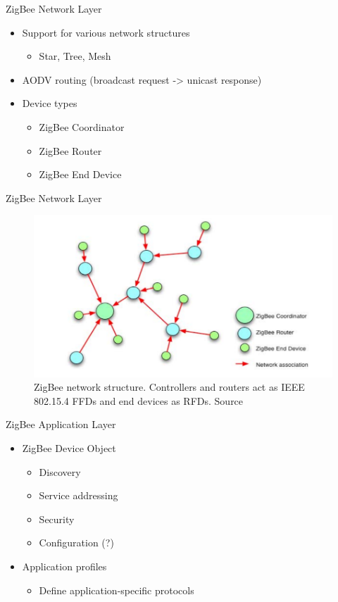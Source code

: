 \documentclass{beamer}
\begin{document}
\begin{frame}{ZigBee Network Layer}
  \begin{itemize}
  	\item Support for various network structures
  	\begin{itemize}
  		\item Star, Tree, Mesh
  	\end{itemize}
  	\item AODV routing (broadcast request -> unicast response)
  	\item Device types
  	\begin{itemize}
  		\item ZigBee Coordinator
  		\item ZigBee Router
  		\item ZigBee End Device
  	\end{itemize}
  \end{itemize}
\end{frame}

\begin{frame}{ZigBee Network Layer}
  \begin{figure}
  \includegraphics[width=\textwidth]{zbnetstructure.png}
  \caption{ZigBee network structure. Controllers and routers act as IEEE 802.15.4 FFDs and end devices as RFDs. Source \cite{zbslides}}
  \end{figure}
\end{frame}

\begin{frame}{ZigBee Application Layer}
  \begin{itemize}
  	\item ZigBee Device Object
  	\begin{itemize}
  		\item Discovery
  		\item Service addressing
  		\item Security
  		\item Configuration (?)
  	\end{itemize}
  	\item Application profiles
  	\begin{itemize}
  		\item Define application-specific protocols 
  	\end{itemize}
  \end{itemize}
\end{frame}
\end{document}

